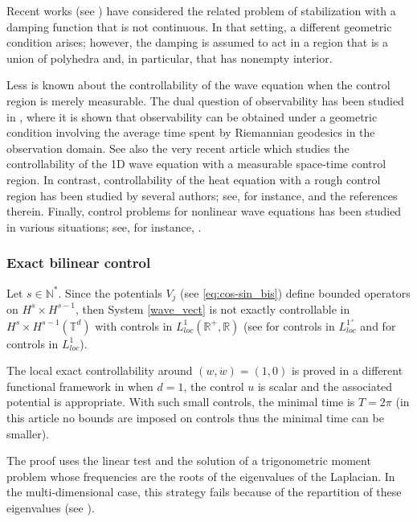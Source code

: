 \documentclass[a4paper]{article}
\theoremstyle{plain}
\newcommand{\T}{\mathbb{T}}
\newcommand{\R}{\mathbb{R}}
\begin{document}
Recent works (see \cite{Burq2020, Rouveyrol2024}) have considered the related problem of stabilization with a damping function that is not continuous. In that setting, a different geometric condition arises; however, the damping is assumed to act in a region that is a union of polyhedra and, in particular, that has nonempty interior.
    
Less is known about the controllability of the wave equation when the control region is merely measurable. The dual question of observability has been studied in \cite{Humbert2019}, where it is shown that observability can be obtained under a geometric condition involving the average time spent by Riemannian geodesics in the observation domain. See also the very recent article \cite{niu2025symmetrywaveequationtorus} which studies the controllability of the 1D wave equation with a measurable space-time control region. In contrast, controllability of the heat equation with a rough control region has been studied by several authors; see, for instance, \cite{BurqMoyano2022} and the references therein. Finally, control problems for nonlinear wave equations has been studied in various situations; see, for instance, \cite{Coron2006, DehmanLebeau, Fattorini, Lasiecka05, Lasiecka1991, Perrin2026, TonBui, Zhou}. 


\subsubsection{Exact bilinear control}

Let $s \in \mathbb{N}^*$. Since the potentials $V_j$ (see \eqref{eq:cos-sin_bis}) define bounded operators on $H^{s} \times H^{s-1}$, then System \eqref{wave_vect} is not exactly controllable in $H^{s} \times H^{s-1}(\T^d)$ with controls in $L^{1}_{loc}(\R^+,\R)$ (see \cite{BMS} for controls in $L^{1^+}_{loc}$ and \cite{chambrion-laurent} for controls in $L^{1}_{loc}$). 

The local exact controllability around $(w,\dot{w})=(1,0)$ is proved in a different functional framework in \cite{beauchard-laurent, beauchard-wave} when $d=1$, the control $u$ is scalar and the associated potential is appropriate. With such small controls, the minimal time is $T=2\pi$ (in this article no bounds are imposed on controls thus the minimal time can be smaller).

The proof uses the linear test and the solution of a trigonometric moment problem whose frequencies are the roots of the eigenvalues of the Laplacian. In the multi-dimensional case, this strategy fails because of the repartition of these eigenvalues (see 
\cite{haraux-jaffard}).
\end{document}
